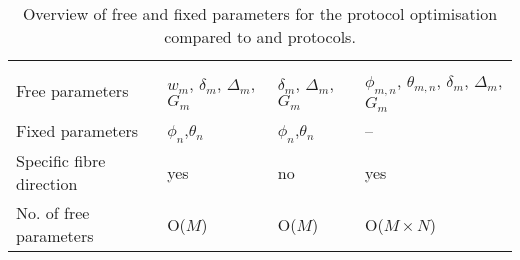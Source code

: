 \begin{table}[th]
  	\caption{Overview of free and fixed parameters for the \SFasym{} protocol optimisation compared to \SF{} and \OI{} protocols.} 
	\centering \vspace{2ex}
    	\label{tab:chapter8 asym parameter overview}
    	\begin{adjustbox}{width={\textwidth},totalheight=\textheight,keepaspectratio}
        	\begin{tabular}{@{}y{0.30\textwidth}x{0.20\textwidth}x{0.20\textwidth}x{0.20\textwidth}@{}}
                \toprule
					& {\SFasym} & {\OI} & {\FD} \\%
				\cmidrule(rl){2-2}\cmidrule(rl){3-3}	\cmidrule(l){4-4}
				Free parameters & $w_m$, $\delta_m$, $\Delta_m$, $G_m$ & $\delta_m$, $\Delta_m$, $G_m$ & $\phi_{m,n}$, $\theta_{m,n}$, $\delta_m$, $\Delta_m$, $G_m$ \\[2ex]
        		Fixed parameters & $\phi_n$,$\theta_n$ & $\phi_n$,$\theta_n$ & --  \\[2ex]
        		Specific fibre direction & yes & no & yes \\[2ex]
        		No. of free parameters & O($M$) &O($M$) & O($M\times N$) \\
        		\bottomrule
        	\end{tabular}        	
    \end{adjustbox}
\end{table}

 

